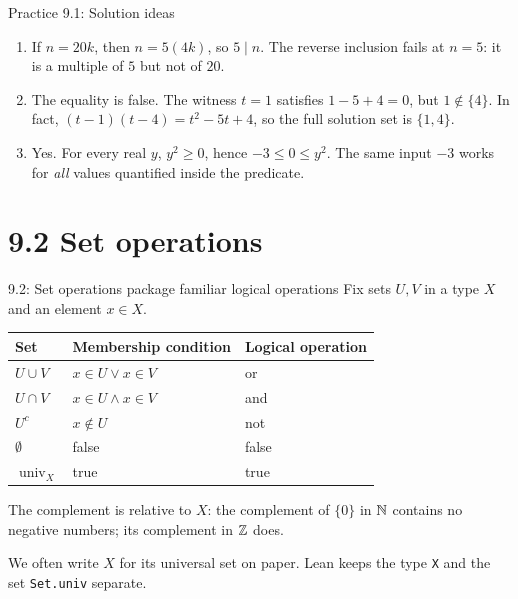 \begin{frame}{Practice 9.1: Solution ideas}
\begin{enumerate}
\item If $n=20k$, then $n=5(4k)$, so $5\mid n$.
The reverse inclusion fails at $n=5$: it is a multiple of $5$ but not of $20$.
\item The equality is false. The witness $t=1$ satisfies $1-5+4=0$,
but $1\notin\{4\}$. In fact,
$(t-1)(t-4)=t^2-5t+4$, so the full solution set is $\{1,4\}$.
\item Yes. For every real $y$, $y^2\ge0$, hence $-3\le0\le y^2$.
The same input $-3$ works for \emph{all} values quantified inside the predicate.
\end{enumerate}
\end{frame}

\section{9.2 Set operations}
\begin{frame}{9.2: Set operations package familiar logical operations}
Fix sets $U,V$ in a type $X$ and an element $x\in X$.
\begin{center}
\begin{tabular}{lll}
\toprule
Set & Membership condition & Logical operation\\\midrule
$U\cup V$ & $x\in U\lor x\in V$ & or\\
$U\cap V$ & $x\in U\land x\in V$ & and\\
$U^c$ & $x\notin U$ & not\\
$\emptyset$ & false & false\\
$\operatorname{univ}_X$ & true & true\\
\bottomrule
\end{tabular}
\end{center}
The complement is relative to $X$: the complement of $\{0\}$ in $\mathbb{N}$ contains
no negative numbers; its complement in $\mathbb{Z}$ does.
\medskip

We often write $X$ for its universal set on paper.
Lean keeps the type \texttt{X} and the set \texttt{Set.univ} separate.
\end{frame}

